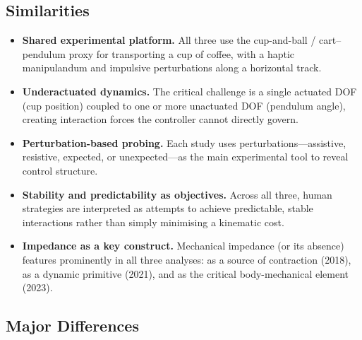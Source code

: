 \documentclass[11pt]{article}
\begin{document}
\subsection*{Similarities}

\begin{itemize}[leftmargin=1.2em]
  \item \textbf{Shared experimental platform.}  All three use the cup-and-ball / cart--pendulum proxy for transporting a cup of coffee, with a haptic manipulandum and impulsive perturbations along a horizontal track.
  \item \textbf{Underactuated dynamics.}  The critical challenge is a single actuated DOF (cup position) coupled to one or more unactuated DOF (pendulum angle), creating interaction forces the controller cannot directly govern.
  \item \textbf{Perturbation-based probing.}  Each study uses perturbations---assistive, resistive, expected, or unexpected---as the main experimental tool to reveal control structure.
  \item \textbf{Stability and predictability as objectives.}  Across all three, human strategies are interpreted as attempts to achieve predictable, stable interactions rather than simply minimising a kinematic cost.
  \item \textbf{Impedance as a key construct.}  Mechanical impedance (or its absence) features prominently in all three analyses: as a source of contraction (2018), as a dynamic primitive (2021), and as the critical body-mechanical element (2023).
\end{itemize}

\subsection*{Major Differences}
\end{document}
